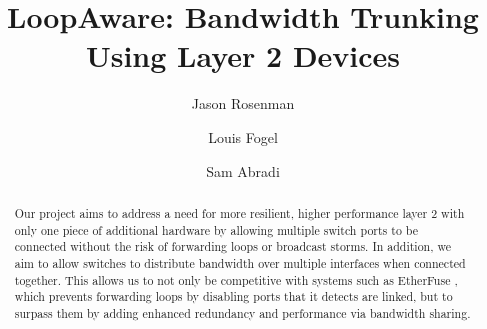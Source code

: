 \documentclass{article}
\title{LoopAware: Bandwidth Trunking Using Layer 2 Devices}
\author{Jason Rosenman \and Louis Fogel \and Sam Abradi}
\date{}
\begin{document}
\maketitle
\begin{abstract}
	Our project aims to address a need for more resilient, higher performance layer 2 with only one piece of additional hardware by allowing multiple switch ports to be connected without the risk of forwarding loops or broadcast storms.
	In addition, we aim to allow switches to distribute bandwidth over multiple interfaces when connected together.
	This allows us to not only be competitive with systems such as EtherFuse \cite{etherfuse}, which prevents forwarding loops by disabling ports that it detects are linked, but to surpass them by adding enhanced redundancy and performance via bandwidth sharing.
\end{abstract}





\newpage


\end{document}
